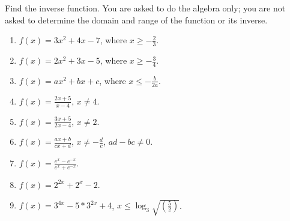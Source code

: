 \begin{problem}
Find the inverse function. You are asked to do the algebra only; you are not asked to determine the domain and range of the function or its inverse. 
\begin{multicols}{2}
\begin{enumerate}
\item $f(x)= 3x^2+4x-7$, where $x\geq -\frac{2}{3}$.

\item $f(x)= 2x^2+3x-5$, where $x\geq -\frac{3}{4}$.

\item $f(x)=ax^2+bx+c$, where $x\leq -\frac{b}{2a}$.

\item $f(x)= \frac{2x+5}{x-4}$, $x\neq 4$.

\item $f(x)= \frac{3x+5}{2x-4}$, $x\neq 2$.

\item $f(x)=\frac{ax+b}{cx+d}$, $x\neq -\frac{d}c$, $ad-bc\neq 0$.

\item $f(x)=\frac{e^x- e^{-x}}{e^x+e^{-x}}$.

\item $f(x)=2^{2x}+2^{x}-2$.

\item $f(x)=3^{4x}- 5* 3^{2x}+4$, $x\leq \log_{3} \sqrt{ \left( \frac{5}{2}\right)}$.

\end{enumerate}
\end{multicols}
\end{problem}
